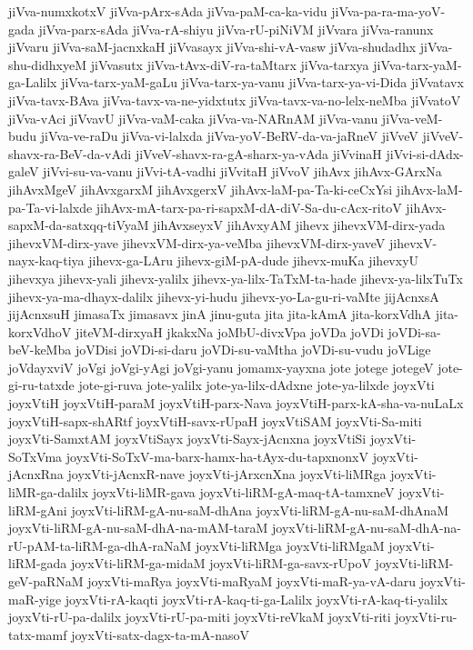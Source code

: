 {jiVva-numxkotxV
jiVva-pArx-sAda
jiVva-paM-ca-ka-vidu
jiVva-pa-ra-ma-yoV-gada
jiVva-parx-sAda
jiVva-rA-shiyu
jiVva-rU-piNiVM
jiVvara
jiVva-ranunx
jiVvaru
jiVva-saM-jacnxkaH
jiVvasayx
jiVva-shi-vA-vasw
jiVva-shudadhx
jiVva-shu-didhxyeM
jiVvasutx
jiVva-tAvx-diV-ra-taMtarx
jiVva-tarxya
jiVva-tarx-yaM-ga-Lalilx
jiVva-tarx-yaM-gaLu
jiVva-tarx-ya-vanu
jiVva-tarx-ya-vi-Dida
jiVvatavx
jiVva-tavx-BAva
jiVva-tavx-va-ne-yidxtutx
jiVva-tavx-va-no-lelx-neMba
jiVvatoV
jiVva-vAci
jiVvavU
jiVva-vaM-caka
jiVva-va-NARnAM
jiVva-vanu
jiVva-veM-budu
jiVva-ve-raDu
jiVva-vi-lalxda
jiVva-yoV-BeRV-da-va-jaRneV
jiVveV
jiVveV-shavx-ra-BeV-da-vAdi
jiVveV-shavx-ra-gA-sharx-ya-vAda
jiVvinaH
jiVvi-si-dAdx-galeV
jiVvi-su-va-vanu
jiVvi-tA-vadhi
jiVvitaH
jiVvoV
jihAvx
jihAvx-GArxNa
jihAvxMgeV
jihAvxgarxM
jihAvxgerxV
jihAvx-laM-pa-Ta-ki-ceCxYsi
jihAvx-laM-pa-Ta-vi-lalxde
jihAvx-mA-tarx-pa-ri-sapxM-dA-diV-Sa-du-cAcx-ritoV
jihAvx-sapxM-da-satxqq-tiVyaM
jihAvxseyxV
jihAvxyAM
jihevx
jihevxVM-dirx-yada
jihevxVM-dirx-yave
jihevxVM-dirx-ya-veMba
jihevxVM-dirx-yaveV
jihevxV-nayx-kaq-tiya
jihevx-ga-LAru
jihevx-giM-pA-dude
jihevx-muKa
jihevxyU
jihevxya
jihevx-yali
jihevx-yalilx
jihevx-ya-lilx-TaTxM-ta-hade
jihevx-ya-lilxTuTx
jihevx-ya-ma-dhayx-dalilx
jihevx-yi-hudu
jihevx-yo-La-gu-ri-vaMte
jijAcnxsA
jijAcnxsuH
jimasaTx
jimasavx
jinA
jinu-guta
jita
jita-kAmA
jita-korxVdhA
jita-korxVdhoV
jiteVM-dirxyaH
jkakxNa
joMbU-divxVpa
joVDa
joVDi
joVDi-sa-beV-keMba
joVDisi
joVDi-si-daru
joVDi-su-vaMtha
joVDi-su-vudu
joVLige
joVdayxviV
joVgi
joVgi-yAgi
joVgi-yanu
jomamx-yayxna
jote
jotege
jotegeV
jote-gi-ru-tatxde
jote-gi-ruva
jote-yalilx
jote-ya-lilx-dAdxne
jote-ya-lilxde
joyxVti
joyxVtiH
joyxVtiH-paraM
joyxVtiH-parx-Nava
joyxVtiH-parx-kA-sha-va-nuLaLx
joyxVtiH-sapx-shARtf
joyxVtiH-savx-rUpaH
joyxVtiSAM
joyxVti-Sa-miti
joyxVti-SamxtAM
joyxVtiSayx
joyxVti-Sayx-jAcnxna
joyxVtiSi
joyxVti-SoTxVma
joyxVti-SoTxV-ma-barx-hamx-ha-tAyx-du-tapxnonxV
joyxVti-jAcnxRna
joyxVti-jAcnxR-nave
joyxVti-jArxcnXna
joyxVti-liMRga
joyxVti-liMR-ga-dalilx
joyxVti-liMR-gava
joyxVti-liRM-gA-maq-tA-tamxneV
joyxVti-liRM-gAni
joyxVti-liRM-gA-nu-saM-dhAna
joyxVti-liRM-gA-nu-saM-dhAnaM
joyxVti-liRM-gA-nu-saM-dhA-na-mAM-taraM
joyxVti-liRM-gA-nu-saM-dhA-na-rU-pAM-ta-liRM-ga-dhA-raNaM
joyxVti-liRMga
joyxVti-liRMgaM
joyxVti-liRM-gada
joyxVti-liRM-ga-midaM
joyxVti-liRM-ga-savx-rUpoV
joyxVti-liRM-geV-paRNaM
joyxVti-maRya
joyxVti-maRyaM
joyxVti-maR-ya-vA-daru
joyxVti-maR-yige
joyxVti-rA-kaqti
joyxVti-rA-kaq-ti-ga-Lalilx
joyxVti-rA-kaq-ti-yalilx
joyxVti-rU-pa-dalilx
joyxVti-rU-pa-miti
joyxVti-reVkaM
joyxVti-riti
joyxVti-ru-tatx-mamf
joyxVti-satx-dagx-ta-mA-nasoV
}
